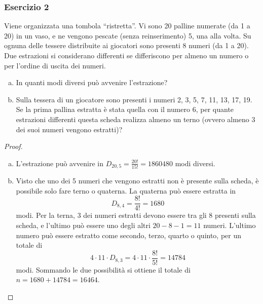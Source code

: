 \documentclass{beamer}
\begin{document}
\begin{frame}[fragile]
	\frametitle{Esercizio 2}

	\begin{exercise}

		Viene organizzata una tombola ``ristretta''. Vi sono 20 palline numerate (da 1 a 20) in un vaso, e ne vengono pescate (senza reinserimento) 5, una alla volta. Su ognuna delle tessere distribuite ai giocatori sono presenti 8 numeri (da 1 a 20). Due estrazioni si considerano differenti se differiscono per almeno un numero o per l'ordine di uscita dei numeri.

		\begin{enumerate}[(a)]
			\item In quanti modi diversi pu\`o avvenire l'estrazione?
			\item Sulla tessera di un giocatore sono presenti i numeri 2, 3, 5, 7, 11, 13, 17, 19. Se la prima pallina estratta è stata quella con il numero 6, per quante estrazioni differenti questa scheda realizza almeno un terno (ovvero almeno 3 dei suoi numeri vengono estratti)?
		\end{enumerate}
	\end{exercise}
\end{frame}

\begin{frame}[fragile]
	\begin{proof}%

		\begin{enumerate}[(a)]
			\item L'estrazione pu\`o avvenire in $D_{20,5}=\frac{20!}{15!}=1860480$ modi diversi.
			\item Visto che uno dei 5 numeri che vengono estratti non è presente sulla scheda, è possibile solo fare terno o quaterna. La quaterna può essere estratta in $$D_{8,4}=\frac{8!}{4!}=1680$$ modi. Per la terna, 3 dei numeri estratti devono essere tra gli 8 presenti sulla scheda, e l'ultimo può essere uno degli altri $20-8-1=11$ numeri. L'ultimo numero può essere estratto come secondo, terzo, quarto o quinto, per un totale di $$4\cdot11\cdot D_{8,3}=4\cdot11\cdot\frac{8!}{5!}=14784$$ modi. Sommando le due possibilità si ottiene il totale di $n=1680+14784=16464$. \qedhere
		\end{enumerate}
	\end{proof}
\end{frame}
\end{document}
